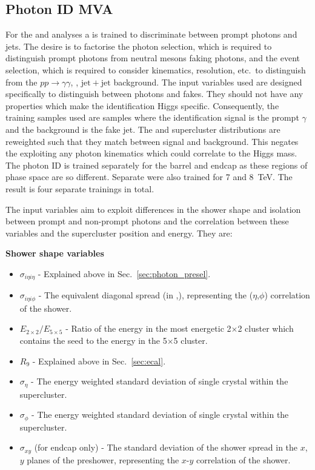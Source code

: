 \subsection{Photon ID \acs{MVA}}
\label{sec:pho_id_mva}

For the \MFM and \SMVA analyses a \BDT is trained to discriminate between prompt photons and jets. The desire is to factorise the photon selection, which is required to distinguish prompt photons from neutral mesons faking photons, and the event selection, which is required to consider kinematics, resolution, etc.~to distinguish \Hgg from the $pp\rightarrow\gamma\gamma$, \gjet, $\mathrm{jet}+\mathrm{jet}$ background. The input variables used are designed specifically to distinguish between photons and fakes. They should not have any properties which make the identification Higgs specific. Consequently, the training samples used are \gjet samples where the identification \BDT signal is the prompt $\gamma$ and the background is the fake jet. The \pT and supercluster \eta distributions are reweighted such that they match between signal and background. This negates the \BDT exploiting any photon kinematics which could correlate to the Higgs mass. The photon ID \BDT is trained separately for the barrel and endcap as these regions of phase space are so different. Separate \BDTs were also trained for 7 and 8~TeV. The result is four separate trainings in total.

The input variables aim to exploit differences in the shower shape and isolation between prompt and non-prompt photons and the correlation between these variables and the supercluster position and energy. They are:

\noindent\textbf{Shower shape variables}
\begin{itemize}
  \item $\sigma_{i\eta i\eta}$ - Explained above in Sec.~\ref{sec:photon_presel}.
  \item $\sigma_{i\eta i\phi}$ - The equivalent diagonal spread (in \eta,\phi), representing the ($\eta$,$\phi$) correlation of the shower.
  \item $E_{2\times2}/E_{5\times5}$ - Ratio of the energy in the most energetic 2$\times$2 cluster which contains the seed to the energy in the 5$\times$5 cluster.
  \item $R_{9}$ - Explained above in Sec.~\ref{sec:ecal}.
  \item $\sigma_{\eta}$ - The energy weighted standard deviation of single crystal \eta within the supercluster.
  \item $\sigma_{\phi}$ - The energy weighted standard deviation of single crystal \phi within the supercluster.
  \item $\sigma_{xy}$ (for endcap only) - The standard deviation of the shower spread in the $x$, $y$ planes of the preshower, representing the $x$-$y$ correlation of the shower.
\end{itemize}

